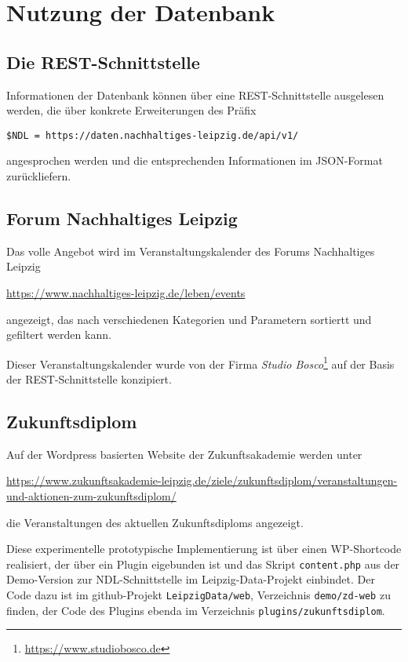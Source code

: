 \documentclass[a4paper,11pt]{article}
\begin{document}
\section{Nutzung der Datenbank}

\subsection{Die REST-Schnittstelle}

Informationen der Datenbank können über eine REST-Schnittstelle ausgelesen
werden, die über konkrete Erweiterungen des Präfix
\begin{center}
  \texttt{\$NDL = https://daten.nachhaltiges-leipzig.de/api/v1/}
\end{center}
angesprochen werden und die entsprechenden Informationen im JSON-Format
zurückliefern.

\subsection{Forum Nachhaltiges Leipzig}

Das volle Angebot wird im Veranstaltungskalender des Forums Nachhaltiges
Leipzig
\begin{center}
  \url{https://www.nachhaltiges-leipzig.de/leben/events}
\end{center}
angezeigt, das nach verschiedenen Kategorien und Parametern sortiertt und
gefiltert werden kann.

Dieser Veranstaltungskalender wurde von der Firma \emph{Studio
  Bosco}\footnote{\url{https://www.studiobosco.de}} auf der Basis der
REST-Schnittstelle konzipiert. 

\subsection{Zukunftsdiplom}

Auf der Wordpress basierten Website der Zukunftsakademie werden unter 
\begin{center}
  \url{https://www.zukunftsakademie-leipzig.de/ziele/zukunftsdiplom/veranstaltungen-und-aktionen-zum-zukunftsdiplom/}
\end{center}
die Veranstaltungen des aktuellen Zukunftsdiploms angezeigt.

Diese experimentelle prototypische Implementierung ist über einen WP-Shortcode
realisiert, der über ein Plugin eigebunden ist und das Skript
\texttt{content.php} aus der Demo-Version zur NDL-Schnittstelle im
Leipzig-Data-Projekt einbindet. Der Code dazu ist im github-Projekt
\texttt{LeipzigData/web}, Verzeichnis \texttt{demo/zd-web} zu finden, der Code
des Plugins ebenda im Verzeichnis \texttt{plugins/zukunftsdiplom}.
\end{document}
